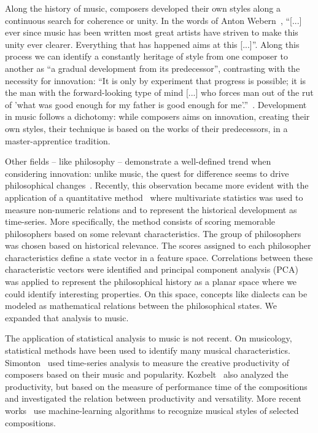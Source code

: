 \documentclass[
 aip,
 jmp,
 amsmath,amssymb,
 reprint,
]{revtex4-1}
\begin{document}
Along the history of music, composers developed their own styles along a
continuous search for coherence or unity. In the words of Anton
Webern~\cite{Webern}, ``[...] ever since music has been written most great artists
have striven to make this unity ever clearer. Everything that has
happened aims at this [...]''. Along this process we can identify
a constantly heritage of style from one composer to another as
``a gradual development from its
predecessor'', contrasting with the necessity for innovation: 
``It is only by experiment that progress is possible; it is the man
with the forward-looking type of mind [...] who forces man out of the
rut of 'what was good enough for my father is good enough for me'.''~\cite{Lovelock}.
Development in music follows a dichotomy: while composers aims on
innovation, creating their own styles, their technique is based on the
works of their predecessors, in a master-apprentice tradition.

Other fields -- like philosophy -- demonstrate
a well-defined trend when considering innovation: unlike music, the
quest for difference seems to drive philosophical
changes~\cite{Deleuze}. Recently, this observation became more evident with
the application of a quantitative method~\cite{Fabbri} where
multivariate statistics was used to measure non-numeric relations and
to represent the historical development as time-series. More specifically, the method consists of
scoring memorable philosophers based on some relevant
characteristics. The group of philosophers was chosen
based on historical relevance. The
scores assigned to each philosopher characteristics define a state
vector in a feature space. Correlations between these
characteristic vectors were identified and principal component
analysis (PCA) was applied to
represent the philosophical history as a planar space where we could
identify interesting properties. On this space, concepts
like dialects can be modeled as mathematical relations between the
philosophical states. We
expanded that analysis to music.

The application of statistical analysis to
music is not recent. On musicology, statistical methods have been used
to identify many musical characteristics.
Simonton~\cite{Simonton1991829, Simonton1977791} used time-series analysis to measure the creative productivity
of composers based on their music and popularity. Kozbelt~\cite{Kozbelt01012009, Kozbelt01012007} also
analyzed the productivity, but based on the measure of performance
time of the compositions and investigated the relation between
productivity and versatility. More recent works~\cite{Kranenburg2004, Kranenburg2007} use machine-learning
algorithms to recognize musical styles of selected compositions.
\end{document}
